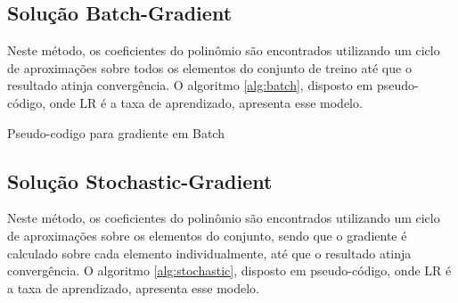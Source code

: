 \documentclass[conference]{IEEEtran}
\begin{document}
\subsection{Solução Batch-Gradient}
Neste método, os coeficientes do polinômio são encontrados utilizando um ciclo de aproximações sobre todos os elementos do conjunto de treino até que o resultado atinja convergência. O algoritmo \ref{alg:batch}, disposto em pseudo-código, onde LR é a taxa de aprendizado, apresenta esse modelo.

\begin{algorithm}
		\caption{Pseudo-codigo para gradiente em Batch}
		\label{alg:batch}
	\end{algorithm}
	
\subsection{Solução Stochastic-Gradient}
Neste método, os coeficientes do polinômio são encontrados utilizando um ciclo de aproximações sobre os elementos do conjunto, sendo que o gradiente é calculado sobre cada elemento individualmente, até que o resultado atinja convergência. O algoritmo \ref{alg:stochastic}, disposto em pseudo-código, onde LR é a taxa de aprendizado, apresenta esse modelo.
\end{document}

